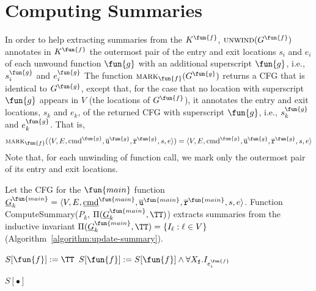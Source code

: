 
\section{Computing Summaries}\label{sec:computing-summary}

In order to help extracting summaries from the $K^\fun{f}$, $\textsc{unwind}(G^\fun{f})$ annotates in $K^\fun{f}$ the outermost pair of the entry and exit locations ${s_i}$ and ${e_i}$ of each unwound function $\fun{g}$ with an additional superscript $\fun{g}$, i.e., $s_i^\fun{g}$ and $e_i^\fun{g}$
The function $\textsc{mark}_\fun{f}(G^\fun{g})$ returns a CFG that is identical to $G^\fun{g}$, except that, for the case that no location with superscript $\fun{g}$ appears in $V$ (the locations of $G^\fun{f}$), it annotates the entry and exit locations, $s_k$ and $e_k$, of the returned CFG with superscript $\fun{g}$, i.e., $s_k^\fun{g}$ and $e_k^\fun{g}$. That is, 
\[
\textsc{mark}_\fun{f}(\langle
V, E,\textmd{cmd}^\fun{g}, \overline{\texttt{u}}^\fun{g}, \overline{\texttt{r}}^\fun{g},s,e \rangle) = 
\langle V, E,\textmd{cmd}^\fun{g}, \overline{\texttt{u}}^\fun{g}, \overline{\texttt{r}}^\fun{g},s,e \rangle
\]
Note that, for each unwinding of function call, we mark only the outermost pair of its entry and exit locations.


Let the CFG for the $\fun{main}$ function $\underline{G}^{\fun{main}}_k = \langle V, E, \underline{\textmd{cmd}}^{\fun{main}}, \overline{\mathtt{u}}^{\fun{main}}, \overline{\mathtt{r}}^{\fun{main}},s,e \rangle$.
Function 
ComputeSummary($P_k$, $\Pi (\underline{G}^{\fun{main}}_k, \TT)$)
extracts summaries from the inductive invariant $\Pi (\underline{G}^{\fun{main}}_k, \TT)= \{ I_\ell : \ell \in V
\}$ (Algorithm~\ref{algorithm:update-summary}). 

\begin{algorithm}

  {	
  	$S[\fun{f}]:=\TT$\;
   	{
       	{
         		$S[\fun{f}]:=S[\fun{f}]\wedge \forall X_\mathtt{f}. I_{e_i^\fun{f}}$       	}
       	}
    
  }
 
  \Return $S[\bullet]$\;
  \caption{
  $\textmd{ComputeSummary}(P_k, \Pi (\underline{G}^{\fun{main}}_k, \TT))$}
  \label{algorithm:update-summary}
\end{algorithm}

